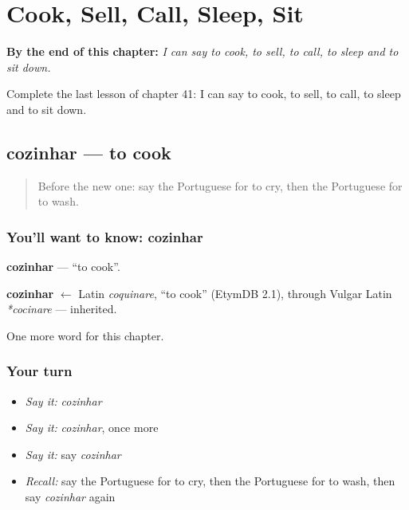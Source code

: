 
\chapter{Cook, Sell, Call, Sleep, Sit}
\label{ch:pt-cook-sell-call-sleep-sit}

\begin{chapteropening}
\textbf{By the end of this chapter:} \emph{I can say to cook, to sell, to call, to sleep and to sit down.}

Complete the last lesson of chapter 41: I can say to cook, to sell, to call, to sleep and to sit down.
\end{chapteropening}

\section[cozinhar]{cozinhar — to cook}

\label{lesson:PT-C41-cozinhar}



\begin{quote}
Before the new one: say the Portuguese for to cry, then the Portuguese for to wash.
\end{quote}

\subsection*{You'll want to know: cozinhar}
\textbf{cozinhar} — \textquotedblleft{}to cook\textquotedblright{}.

\begin{cousinweb}
\textbf{cozinhar} $\leftarrow$ Latin \emph{coquinare}, \textquotedblleft{}to cook\textquotedblright{} (EtymDB 2.1), through Vulgar Latin \emph{*cocinare} — inherited.
\end{cousinweb}

\begin{grammarlens}[title={What you've built}]
One more word for this chapter.
\end{grammarlens}

\subsection*{Your turn}
\begin{itemize}
\raggedright
  \item \emph{Say it:} \emph{cozinhar}
  \item \emph{Say it:} \emph{cozinhar}, once more
  \item \emph{Say it:} say \emph{cozinhar}
  \item \emph{Recall:} say the Portuguese for to cry, then the Portuguese for to wash, then say \emph{cozinhar} again
\end{itemize}

